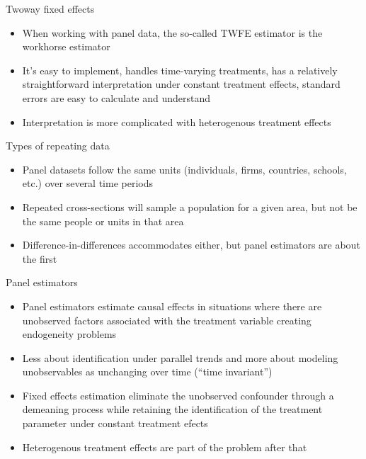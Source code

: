 \documentclass{beamer}
\begin{document}
\begin{frame}{Twoway fixed effects}

\begin{itemize}
\item When working with panel data, the so-called TWFE estimator is the workhorse estimator
\item It's easy to implement, handles time-varying treatments, has a relatively straightforward interpretation under constant treatment effects, standard errors are easy to calculate and understand
\item Interpretation is more complicated with heterogenous treatment effects
\end{itemize}

\end{frame}


\begin{frame}{Types of repeating data}

	\begin{itemize}
	\item Panel datasets follow the same units (individuals, firms, countries, schools, etc.) over several time periods
	\item Repeated cross-sections will sample a population for a given area, but not be the same people or units in that area
	\item Difference-in-differences accommodates either, but panel estimators are about the first 
	\end{itemize}
\end{frame}



\begin{frame}{Panel estimators}

	\begin{itemize}
	\item Panel estimators estimate causal effects in situations where there are unobserved factors associated with the treatment variable creating endogeneity problems
	\item Less about identification under parallel trends and more about modeling unobservables as unchanging over time (``time invariant'')
	\item Fixed effects estimation eliminate the unobserved confounder through a demeaning process while retaining the identification of the treatment parameter under constant treatment efects
	\item Heterogenous treatment effects are part of the problem after that
	\end{itemize}
\end{frame}
\end{document}
